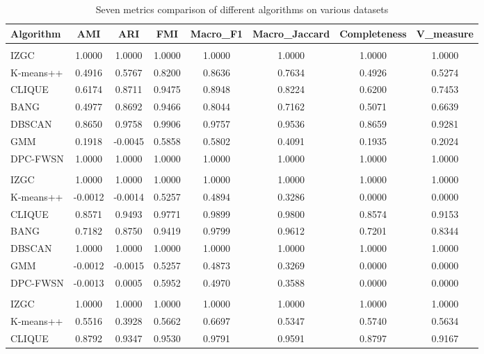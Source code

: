 \begin{table}[ht!]
\centering
\caption{Seven metrics comparison of different algorithms on various datasets}
\label{tab:dataset_metrics_7metrics}
\footnotesize
\begin{tabular*}{\linewidth}{@{} lccccccc @{}}
\toprule
Algorithm & AMI & ARI & FMI & Macro_F1 & Macro_Jaccard & Completeness & V_measure \\
\midrule
\addlinespace
\multicolumn{8}{l}{\textbf{Jain}} \\
IZGC & 1.0000 & 1.0000 & 1.0000 & 1.0000 & 1.0000 & 1.0000 & 1.0000 \\
K-means++ & 0.4916 & 0.5767 & 0.8200 & 0.8636 & 0.7634 & 0.4926 & 0.5274 \\
CLIQUE & 0.6174 & 0.8711 & 0.9475 & 0.8948 & 0.8224 & 0.6200 & 0.7453 \\
BANG & 0.4977 & 0.8692 & 0.9466 & 0.8044 & 0.7162 & 0.5071 & 0.6639 \\
DBSCAN & 0.8650 & 0.9758 & 0.9906 & 0.9757 & 0.9536 & 0.8659 & 0.9281 \\
GMM & 0.1918 & -0.0045 & 0.5858 & 0.5802 & 0.4091 & 0.1935 & 0.2024 \\
DPC-FWSN & 1.0000 & 1.0000 & 1.0000 & 1.0000 & 1.0000 & 1.0000 & 1.0000 \\
\addlinespace
\addlinespace
\multicolumn{8}{l}{\textbf{Ring}} \\
IZGC & 1.0000 & 1.0000 & 1.0000 & 1.0000 & 1.0000 & 1.0000 & 1.0000 \\
K-means++ & -0.0012 & -0.0014 & 0.5257 & 0.4894 & 0.3286 & 0.0000 & 0.0000 \\
CLIQUE & 0.8571 & 0.9493 & 0.9771 & 0.9899 & 0.9800 & 0.8574 & 0.9153 \\
BANG & 0.7182 & 0.8750 & 0.9419 & 0.9799 & 0.9612 & 0.7201 & 0.8344 \\
DBSCAN & 1.0000 & 1.0000 & 1.0000 & 1.0000 & 1.0000 & 1.0000 & 1.0000 \\
GMM & -0.0012 & -0.0015 & 0.5257 & 0.4873 & 0.3269 & 0.0000 & 0.0000 \\
DPC-FWSN & -0.0013 & 0.0005 & 0.5952 & 0.4970 & 0.3588 & 0.0000 & 0.0000 \\
\addlinespace
\addlinespace
\multicolumn{8}{l}{\textbf{Cth}} \\
IZGC & 1.0000 & 1.0000 & 1.0000 & 1.0000 & 1.0000 & 1.0000 & 1.0000 \\
K-means++ & 0.5516 & 0.3928 & 0.5662 & 0.6697 & 0.5347 & 0.5740 & 0.5634 \\
CLIQUE & 0.8792 & 0.9347 & 0.9530 & 0.9791 & 0.9591 & 0.8797 & 0.9167 \\

\end{tabular*}
\end{table}
